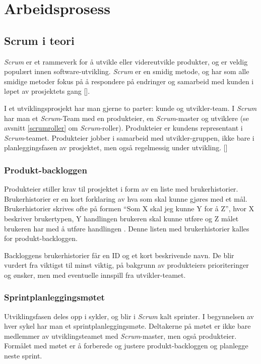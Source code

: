 \documentclass[12pt,a4paper,norsk]{article}
\begin{document}
	\section{Arbeidsprosess}
	\subsection{Scrum i teori}
	\textit{Scrum} er et rammeverk for å utvikle eller videreutvikle produkter, og er veldig populært innen software-utvikling. \textit{Scrum} er en smidig metode, og har som alle smidige metoder fokus på å respondere på endringer og samarbeid med kunden i løpet av prosjektets gang [\cite{agilemanifesto}].
	
	I et utviklingsprosjekt har man gjerne to parter: kunde og utvikler-team. I \textit{Scrum} har man et \textit{Scrum}-Team med en produkteier, en \textit{Scrum}-master og utviklere (se avsnitt \ref{scrumroller} om \textit{Scrum}-roller). Produkteier er kundens representant i \textit{Scrum}-teamet. Produkteier jobber i samarbeid med utvikler-gruppen, ikke bare i planleggingsfasen av prosjektet, men også regelmessig under utvikling.
	[\cite{scrumguides}]
	\subsubsection{Produkt-backloggen}
	Produkteier stiller krav til prosjektet i form av en liste med brukerhistorier. Brukerhistorier er en kort forklaring av hva som skal kunne gjøres med et mål. Brukerhistorier skrives ofte på formen “Som X skal jeg kunne Y for å Z”, hvor X beskriver brukertypen, Y handlingen brukeren skal kunne utføre og Z målet brukeren har med å utføre handlingen \cite[side 9]{kniberg}. Denne listen med brukerhistorier kalles for produkt-backloggen.

    Backloggens brukerhistorier får en ID og et kort beskrivende navn. De blir vurdert fra viktigst til minst viktig, på bakgrunn av produkteiers prioriteringer og ønsker, men med eventuelle innspill fra utvikler-teamet.
	\subsubsection{Sprintplanleggingsmøtet}
	Utviklingsfasen deles opp i sykler, og blir i \textit{Scrum} kalt sprinter. I begynnelsen av hver sykel har man et sprintplanleggingsmøte. Deltakerne på møtet er ikke bare medlemmer av utviklingsteamet med \textit{Scrum}-master, men også produkteier. Formålet med møtet er å forberede og justere produkt-backloggen og planlegge neste sprint.
\end{document}
